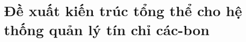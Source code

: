 %
%
%
%
%

\section{Đề xuất kiến trúc tổng thể cho hệ thống quản lý tín chỉ các-bon}
\label{sec:kientruc}

